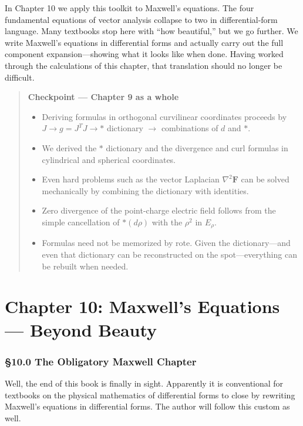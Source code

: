 \documentclass[a4paper,12pt,openany]{book}
\begin{document}
In Chapter 10 we apply this toolkit to Maxwell's equations. The four
fundamental equations of vector analysis collapse to two in
differential-form language. Many textbooks stop here with ``how
beautiful,'' but we go further. We write Maxwell's equations in
differential forms and actually carry out the full component
expansion—showing what it looks like when done. Having worked through
the calculations of this chapter, that translation should no longer be
difficult.

\begin{quote}
\textbf{Checkpoint — Chapter 9 as a whole}

\begin{itemize}
\item
  Deriving formulas in orthogonal curvilinear coordinates proceeds by
  \(J \to g = J^T J \to \ast\) dictionary \(\to\) combinations of \(d\)
  and \(\ast\).
\item
  We derived the \(\ast\) dictionary and the divergence and curl
  formulas in cylindrical and spherical coordinates.
\item
  Even hard problems such as the vector Laplacian \(\nabla^2\mathbf{F}\)
  can be solved mechanically by combining the dictionary with
  identities.
\item
  Zero divergence of the point-charge electric field follows from the
  simple cancellation of \(\ast(d\rho)\) with the \(\rho^2\) in
  \(E_\rho\).
\item
  Formulas need not be memorized by rote. Given the dictionary—and
  even that dictionary can be reconstructed on the spot—everything can
  be rebuilt when needed.
\end{itemize}
\end{quote}

\newpage

\hypertarget{chapter-10-maxwells-equations-beyond-beauty}{%
\chapter{Chapter 10: Maxwell's Equations — Beyond
Beauty}\label{chapter-10-maxwells-equations-beyond-beauty}}

\hypertarget{the-obligatory-maxwell-chapter}{%
\subsection{§10.0 The Obligatory Maxwell
Chapter}\label{the-obligatory-maxwell-chapter}}

Well, the end of this book is finally in sight. Apparently it is
conventional for textbooks on the physical mathematics of differential
forms to close by rewriting Maxwell's equations in differential forms.
The author will follow this custom as well.
\end{document}

